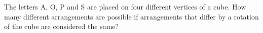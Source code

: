 The letters A, O, P and S are placed on four different vertices of a cube. How many different arrangements are possible if arrangements that differ by a rotation of the cube are considered the same?
